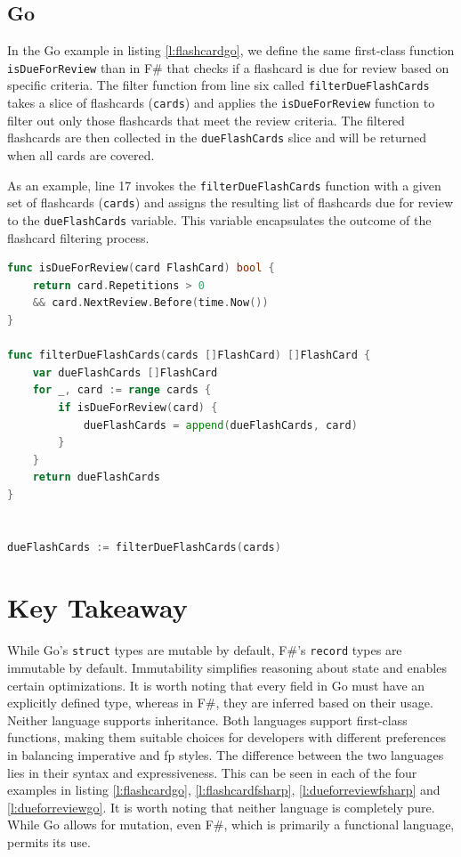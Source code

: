       
    \subsection*{Go}
    In the Go example in listing \ref{l:flashcardgo}, we define the same first-class function \texttt{isDueForReview} than in F\# that checks if a flashcard is due for review based on specific criteria. The filter function from line six called \texttt{filterDueFlashCards} takes a slice of flashcards (\texttt{cards}) and applies the \texttt{isDueForReview} function to filter out only those flashcards that meet the review criteria. The filtered flashcards are then collected in the \texttt{dueFlashCards} slice and will be returned when all cards are covered.
    
    As an example, line 17 invokes the \texttt{filterDueFlashCards} function with a given set of flashcards (\texttt{cards}) and assigns the resulting list of flashcards due for review to the \texttt{dueFlashCards} variable. This variable encapsulates the outcome of the flashcard filtering process.

\begin{lstlisting}[language=go, firstnumber=1, caption={FlashCard representation in F\#}, label=l:dueforreviewgo]
func isDueForReview(card FlashCard) bool {
    return card.Repetitions > 0 
    && card.NextReview.Before(time.Now())
}

func filterDueFlashCards(cards []FlashCard) []FlashCard {
    var dueFlashCards []FlashCard
    for _, card := range cards {
        if isDueForReview(card) {
            dueFlashCards = append(dueFlashCards, card)
        }
    }
    return dueFlashCards
}


dueFlashCards := filterDueFlashCards(cards)
\end{lstlisting}
            

    \section{Key Takeaway}\label{sec:keytakeaway}
    While Go's \texttt{struct} types are mutable by default, F\#'s \texttt{record} types are immutable by default. Immutability simplifies reasoning about state and enables certain optimizations. It is worth noting that every field in Go must have an explicitly defined type, whereas in F\#, they are inferred based on their usage. Neither language supports inheritance. Both languages support first-class functions, making them suitable choices for developers with different preferences in balancing imperative and \ac{fp} styles. The difference between the two languages lies in their syntax and expressiveness. This can be seen in each of the four examples in listing \ref{l:flashcardgo}, \ref{l:flashcardfsharp}, \ref{l:dueforreviewfsharp} and \ref{l:dueforreviewgo}.
 It is worth noting that neither language is completely pure. While Go allows for mutation, even F\#, which is primarily a functional language, permits its use.


